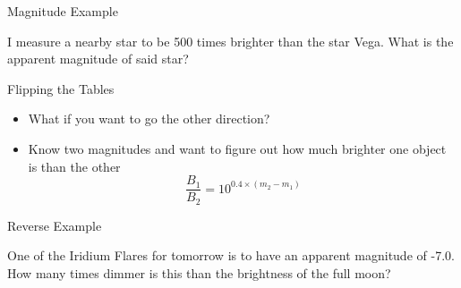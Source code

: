 \documentclass[pdf, aspectratio=169]{beamer}
\begin{document}
\begin{frame}{Magnitude Example}
  \begin{example}
	I measure a nearby star to be 500 times brighter than the star Vega. What is the apparent magnitude of said star?
  \end{example}
\end{frame}

\begin{frame}{Flipping the Tables}
  \begin{itemize}
	\item What if you want to go the other direction?
	\item Know two magnitudes and want to figure out how much brighter one object is than the other
	  \[\frac{B_1}{B_2} = 10^{0.4 \times (m_2-m_1)}\]
  \end{itemize}
\end{frame}

\begin{frame}{Reverse Example}
  \begin{example}
	One of the Iridium Flares for tomorrow is to have an apparent magnitude of -7.0. How many times dimmer is this than the brightness of the full moon?
  \end{example}
\end{frame}

\end{document}
